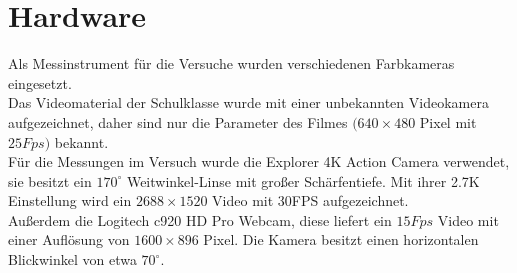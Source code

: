 \section{Hardware}
\label{hardware}
Als Messinstrument für die Versuche wurden verschiedenen Farbkameras eingesetzt.\\
Das Videomaterial der Schulklasse wurde mit einer unbekannten Videokamera aufgezeichnet, daher sind nur die Parameter des Filmes $(640 \times 480$ Pixel mit $25Fps)$ bekannt.\\
Für die Messungen im Versuch wurde die Explorer 4K Action Camera verwendet, sie besitzt ein $170^\circ$ Weitwinkel-Linse mit großer Schärfentiefe. Mit ihrer 2.7K Einstellung wird ein $2688 \times 1520$ Video mit 30FPS aufgezeichnet.\\
Außerdem die Logitech c920 HD Pro Webcam, diese liefert ein $15Fps$ Video mit einer Auflösung von $1600\times 896$ Pixel. Die Kamera besitzt einen horizontalen Blickwinkel von etwa $70^\circ$.